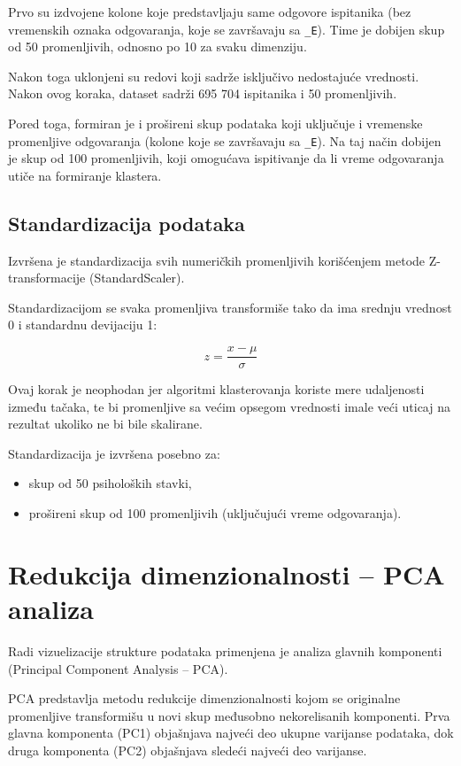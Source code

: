 \documentclass[12pt,a4paper]{article}
\begin{document}
Prvo su izdvojene kolone koje predstavljaju same odgovore ispitanika (bez vremenskih oznaka odgovaranja, koje se završavaju sa \texttt{\_E}). Time je dobijen skup od 50 promenljivih, odnosno po 10 za svaku dimenziju.

Nakon toga uklonjeni su redovi koji sadrže isključivo nedostajuće vrednosti. Nakon ovog koraka, dataset sadrži 695 704 ispitanika i 50 promenljivih.

Pored toga, formiran je i prošireni skup podataka koji uključuje i vremenske promenljive odgovaranja (kolone koje se završavaju sa \texttt{\_E}). Na taj način dobijen je skup od 100 promenljivih, koji omogućava ispitivanje da li vreme odgovaranja utiče na formiranje klastera.

\subsection{Standardizacija podataka}

Izvršena je standardizacija svih numeričkih promenljivih korišćenjem metode Z-transformacije (StandardScaler).

Standardizacijom se svaka promenljiva transformiše tako da ima srednju vrednost 0 i standardnu devijaciju 1:

\[
z = \frac{x - \mu}{\sigma}
\]

Ovaj korak je neophodan jer algoritmi klasterovanja koriste mere udaljenosti između tačaka, te bi promenljive sa većim opsegom vrednosti imale veći uticaj na rezultat ukoliko ne bi bile skalirane.

Standardizacija je izvršena posebno za:
\begin{itemize}
    \item skup od 50 psiholoških stavki,
    \item prošireni skup od 100 promenljivih (uključujući vreme odgovaranja).
\end{itemize}

\section{Redukcija dimenzionalnosti – PCA analiza}

Radi vizuelizacije strukture podataka primenjena je analiza glavnih komponenti (Principal Component Analysis – PCA).

PCA predstavlja metodu redukcije dimenzionalnosti kojom se originalne promenljive transformišu u novi skup međusobno nekorelisanih komponenti. Prva glavna komponenta (PC1) objašnjava najveći deo ukupne varijanse podataka, dok druga komponenta (PC2) objašnjava sledeći najveći deo varijanse.
\end{document}

